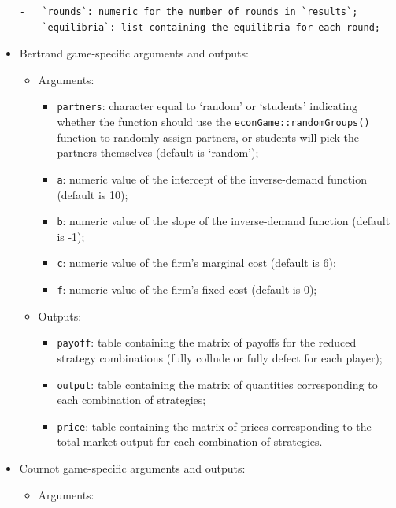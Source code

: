 \documentclass[
]{article}
\providecommand{\tightlist}{%
  \setlength{\itemsep}{0pt}\setlength{\parskip}{0pt}}
\begin{document}
\begin{itemize}
\begin{verbatim}
-   `rounds`: numeric for the number of rounds in `results`;
-   `equilibria`: list containing the equilibria for each round;
\end{verbatim}
\item
  Bertrand game-specific arguments and outputs:

  \begin{itemize}
  \item
    Arguments:

    \begin{itemize}
    \tightlist
    \item
      \texttt{partners}: character equal to `random' or `students'
      indicating whether the function should use the
      \texttt{econGame::randomGroups()} function to randomly assign
      partners, or students will pick the partners themselves (default
      is `random');
    \item
      \texttt{a}: numeric value of the intercept of the inverse-demand
      function (default is 10);
    \item
      \texttt{b}: numeric value of the slope of the inverse-demand
      function (default is -1);
    \item
      \texttt{c}: numeric value of the firm's marginal cost (default is
      6);
    \item
      \texttt{f}: numeric value of the firm's fixed cost (default is 0);
    \end{itemize}
  \item
    Outputs:

    \begin{itemize}
    \tightlist
    \item
      \texttt{payoff}: table containing the matrix of payoffs for the
      reduced strategy combinations (fully collude or fully defect for
      each player);
    \item
      \texttt{output}: table containing the matrix of quantities
      corresponding to each combination of strategies;
    \item
      \texttt{price}: table containing the matrix of prices
      corresponding to the total market output for each combination of
      strategies.
    \end{itemize}
  \end{itemize}
\item
  Cournot game-specific arguments and outputs:

  \begin{itemize}
  \item
    Arguments:


\end{itemize}
\end{itemize}
\end{document}
